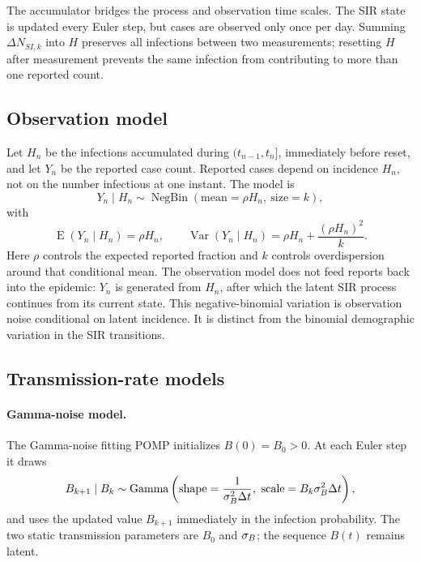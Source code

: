 The accumulator bridges the process and observation time scales.  The SIR
state is updated every Euler step, but cases are observed only once per day.
Summing \(\Delta N_{SI,k}\) into \(H\) preserves all infections between two
measurements; resetting \(H\) after measurement prevents the same infection
from contributing to more than one reported count.

\subsection{Observation model}

Let \(H_n\) be the infections accumulated during
\((t_{n-1},t_n]\), immediately before reset, and let \(Y_n\) be the reported
case count.  Reported cases depend on incidence \(H_n\), not on the number
infectious at one instant.  The model is
\begin{equation}
Y_n\mid H_n
\sim
\operatorname{NegBin}
\left(\text{mean}=\rho H_n,\ \text{size}=k\right),
\label{eq:measurement}
\end{equation}
with
\[
\operatorname{E}(Y_n\mid H_n)=\rho H_n,
\qquad
\operatorname{Var}(Y_n\mid H_n)
=\rho H_n+\frac{(\rho H_n)^2}{k}.
\]
Here \(\rho\) controls the expected reported fraction and \(k\) controls
overdispersion around that conditional mean.  The observation model does not
feed reports back into the epidemic: \(Y_n\) is generated from \(H_n\), after
which the latent SIR process continues from its current state.
This negative-binomial variation is observation noise conditional on latent
incidence.  It is distinct from the binomial demographic variation in the SIR
transitions.

\subsection{Transmission-rate models}

\paragraph{Gamma-noise model.}
The Gamma-noise fitting POMP initializes \(B(0)=B_0>0\).  At each Euler step it
draws
\begin{equation}
B_{k+1}\mid B_k
\sim
\operatorname{Gamma}
\left(
  \text{shape}=\frac{1}{\sigma_B^2\Delta t},
  \ \text{scale}=B_k\sigma_B^2\Delta t
\right),
\label{eq:gamma-update}
\end{equation}
and uses the updated value \(B_{k+1}\) immediately in the infection
probability.  The two static transmission parameters are \(B_0\) and
\(\sigma_B\); the sequence \(B(t)\) remains latent.

